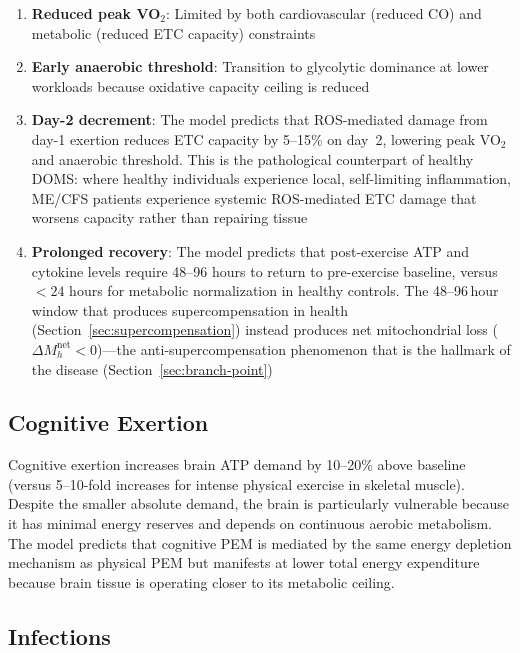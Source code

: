 \begin{enumerate}
    \item \textbf{Reduced peak VO$_2$}: Limited by both cardiovascular (reduced CO) and metabolic (reduced ETC capacity) constraints
    \item \textbf{Early anaerobic threshold}: Transition to glycolytic dominance at lower workloads because oxidative capacity ceiling is reduced
    \item \textbf{Day-2 decrement}: The model predicts that ROS-mediated damage from day-1 exertion reduces ETC capacity by 5--15\% on day~2, lowering peak VO$_2$ and anaerobic threshold. This is the pathological counterpart of healthy DOMS: where healthy individuals experience local, self-limiting inflammation, ME/CFS patients experience systemic ROS-mediated ETC damage that worsens capacity rather than repairing tissue
    \item \textbf{Prolonged recovery}: The model predicts that post-exercise ATP and cytokine levels require 48--96 hours to return to pre-exercise baseline, versus $<24$ hours for metabolic normalization in healthy controls. The 48--96\,hour window that produces supercompensation in health (Section~\ref{sec:supercompensation}) instead produces net mitochondrial loss ($\Delta M_h^{\text{net}} < 0$)---the anti-supercompensation phenomenon that is the hallmark of the disease (Section~\ref{sec:branch-point})
\end{enumerate}

\subsection{Cognitive Exertion}
\label{sec:cognitive-exertion-response}

Cognitive exertion increases brain ATP demand by 10--20\% above baseline (versus 5--10-fold increases for intense physical exercise in skeletal muscle). Despite the smaller absolute demand, the brain is particularly vulnerable because it has minimal energy reserves and depends on continuous aerobic metabolism. The model predicts that cognitive PEM is mediated by the same energy depletion mechanism as physical PEM but manifests at lower total energy expenditure because brain tissue is operating closer to its metabolic ceiling.

\subsection{Infections}
\label{sec:infection-response}

